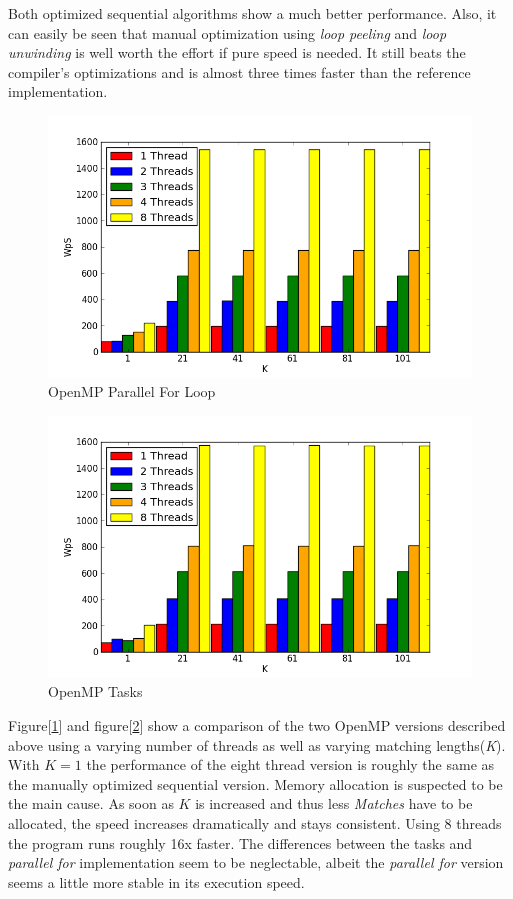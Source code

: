 \documentclass[a4paper,twoside,11pt]{article}
\begin{document}
Both optimized sequential algorithms show a much better performance. Also, it can easily be seen that manual optimization using \textit{loop peeling} and \textit{loop unwinding} is well worth the effort if pure speed is needed. It still beats the compiler's optimizations and is almost three times faster than the reference implementation.

\begin{figure}[hbtp]
\caption{OpenMP Parallel For Loop}
\centering
\label{fig:omp_parallel}
\includegraphics[scale=0.8]{omp_for.png}
\end{figure}

\begin{figure}[hbtp]
\caption{OpenMP Tasks}
\centering
\label{fig:omp_tasks}
\includegraphics[scale=0.8]{omp_tasks.png}
\end{figure}

Figure[\ref{fig:omp_parallel}] and figure[\ref{fig:omp_tasks}] show a comparison of the two OpenMP versions described above using a  varying number of threads as well as varying matching lengths(\textit{K}). With $K=1$ the performance of the eight thread version is roughly the same as the manually optimized sequential version. Memory allocation is suspected to be the main cause. As soon as $K$ is increased and thus less \textit{Matches} have to be allocated, the speed increases dramatically and stays consistent.
Using 8 threads the program runs roughly 16x faster.
The differences between the tasks and \textit{parallel for} implementation seem to be neglectable, albeit the \textit{parallel for} version seems a little more stable in its execution speed.
\end{document}
